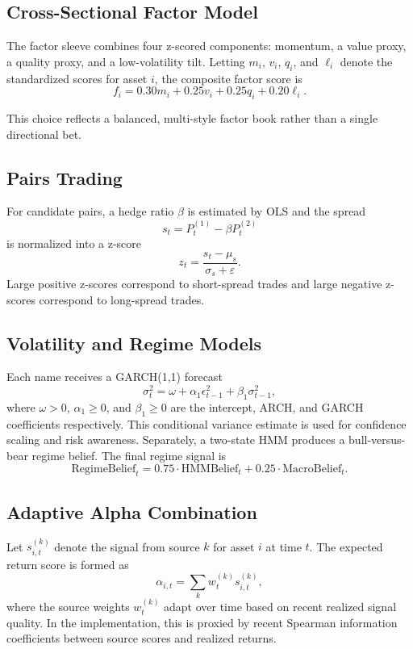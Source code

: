 \documentclass[11pt]{article}
\begin{document}
\subsection{Cross-Sectional Factor Model}

The factor sleeve combines four z-scored components: momentum, a value proxy, a
quality proxy, and a low-volatility tilt. Letting $m_i$, $v_i$, $q_i$, and
$\ell_i$ denote the standardized scores for asset
$i$, the composite factor score is
\[
f_i = 0.30 m_i + 0.25 v_i + 0.25 q_i + 0.20 \ell_i.
\]

This choice reflects a balanced, multi-style factor book rather than a single
directional bet.

\subsection{Pairs Trading}

For candidate pairs, a hedge ratio $\beta$ is estimated by OLS and the spread
\[
s_t = P^{(1)}_t - \beta P^{(2)}_t
\]
is normalized into a z-score
\[
z_t = \frac{s_t - \mu_s}{\sigma_s + \varepsilon}.
\]
Large positive z-scores correspond to short-spread trades and large negative
z-scores correspond to long-spread trades.

\subsection{Volatility and Regime Models}

Each name receives a GARCH(1,1) forecast
\[
\sigma_t^2 = \omega + \alpha_1 \epsilon_{t-1}^2 + \beta_1 \sigma_{t-1}^2,
\]
where $\omega > 0$, $\alpha_1 \geq 0$, and $\beta_1 \geq 0$ are the intercept,
ARCH, and GARCH coefficients respectively. This conditional variance estimate
is used for confidence scaling and risk awareness. Separately, a two-state
HMM produces a bull-versus-bear regime belief. The final regime signal is
\[
\text{RegimeBelief}_t =
0.75 \cdot \text{HMMBelief}_t +
0.25 \cdot \text{MacroBelief}_t.
\]

\subsection{Adaptive Alpha Combination}

Let $s^{(k)}_{i,t}$ denote the signal from source $k$ for asset $i$ at time $t$.
The expected return score is formed as
\[
\alpha_{i,t} = \sum_k w^{(k)}_t s^{(k)}_{i,t},
\]
where the source weights $w^{(k)}_t$ adapt over time based on recent realized
signal quality. In the implementation, this is proxied by recent Spearman
information coefficients between source scores and realized returns.
\end{document}
